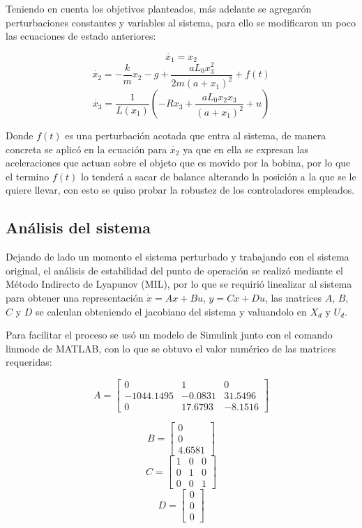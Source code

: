 \documentclass[onecolumn,10pt]{article}
\begin{document}
Teniendo en cuenta los objetivos planteados, m\'as adelante se agregar\'on perturbaciones constantes y variables al sistema, para ello se modificaron un poco las ecuaciones de estado anteriores:

$$
\dot{x_1}=x_2 
$$
$$
\dot{x_2}=-\dfrac{k}{m}x_2-g+\dfrac{aL_0x_3^{2}}{2m(a+x_1)^{2}}+f(t)
$$
$$
\dot{x_3}=\dfrac{1}{L(x_1)}(-Rx_3+\dfrac{aL_0x_2x_3}{(a+x_1)^{2}}+u)
$$

Donde $f(t)$ es una perturbaci\'on acotada que entra al sistema, de manera concreta se aplic\'o en la ecuaci\'on para $\dot{x_2}$ ya que en ella se expresan las aceleraciones que actuan sobre el objeto que es movido por la bobina, por lo que el termino $f(t)$ lo tender\'a a sacar de balance alterando la posici\'on a la que se le quiere llevar, con esto se quiso probar la robustez de los controladores empleados. 

\subsection*{An\'alisis del sistema}
Dejando de lado un momento el sistema perturbado y trabajando con el sistema original, el an\'alisis de estabilidad del punto de operaci\'on se realiz\'o mediante el M\'etodo Indirecto de Lyapunov (MIL), por lo que se requiri\'o linealizar al sistema para obtener una representaci\'on $\dot{x}=Ax+Bu$, $y=Cx+Du$, las matrices $A$, $B$, $C$ y $D$ se calculan obteniendo el jacobiano del sistema y valuandolo en $X_{d}$ y $U_{d}$.


Para facilitar el proceso se us\'o un modelo de Simulink junto con el comando linmode de MATLAB, con lo que se obtuvo el valor num\'erico de las matrices requeridas:

$$A=\begin{bmatrix}
0 & 1 & 0\\
-1044.1495 & -0.0831 & 31.5496\\
0 & 17.6793 & -8.1516
\end{bmatrix}$$

$$
B= \begin{bmatrix}
0 \\ 0 \\ 4.6581
\end{bmatrix}
$$
$$
C= \begin{bmatrix}
1 & 0 & 0\\ 
0 & 1 & 0 \\ 
0 & 0 & 1
\end{bmatrix}
$$
$$
D=\begin{bmatrix}
0 \\ 0 \\ 0
\end{bmatrix}
$$
\end{document}
